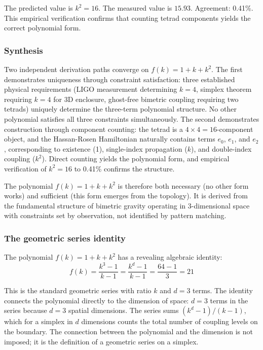 \documentclass[aps,prd,preprint,superscriptaddress,showpacs,preprintnumbers,amsmath,amssymb,nofootinbib]{revtex4-2}
\begin{document}
The predicted value is $k^2 = 16$. The measured value is $15.93$. Agreement: 0.41\%. This empirical verification confirms that counting tetrad components yields the correct polynomial form.

\subsubsection*{Synthesis}

Two independent derivation paths converge on $f(k) = 1 + k + k^2$. The first demonstrates uniqueness through constraint satisfaction: three established physical requirements (LIGO measurement determining $k=4$, simplex theorem requiring $k=4$ for 3D enclosure, ghost-free bimetric coupling requiring two tetrads) uniquely determine the three-term polynomial structure. No other polynomial satisfies all three constraints simultaneously. The second demonstrates construction through component counting: the tetrad is a $4 \times 4 = 16$-component object, and the Hassan-Rosen Hamiltonian naturally contains terms $e_0$, $e_1$, and $e_2$, corresponding to existence (1), single-index propagation ($k$), and double-index coupling ($k^2$). Direct counting yields the polynomial form, and empirical verification of $k^2 = 16$ to 0.41\% confirms the structure.

The polynomial $f(k) = 1 + k + k^2$ is therefore both necessary (no other form works) and sufficient (this form emerges from the topology). It is derived from the fundamental structure of bimetric gravity operating in 3-dimensional space with constraints set by observation, not identified by pattern matching.

\subsubsection*{The geometric series identity}

The polynomial $f(k) = 1 + k + k^2$ has a revealing algebraic identity:
\begin{equation}
f(k) = \frac{k^3 - 1}{k - 1} = \frac{k^d - 1}{k - 1} = \frac{64 - 1}{3} = 21
\label{eq:geometric-series}
\end{equation}

This is the standard geometric series with ratio $k$ and $d = 3$ terms. The identity connects the polynomial directly to the dimension of space: $d = 3$ terms in the series because $d = 3$ spatial dimensions. The series sums $(k^d - 1)/(k - 1)$, which for a simplex in $d$ dimensions counts the total number of coupling levels on the boundary. The connection between the polynomial and the dimension is not imposed; it is the definition of a geometric series on a simplex.
\end{document}
